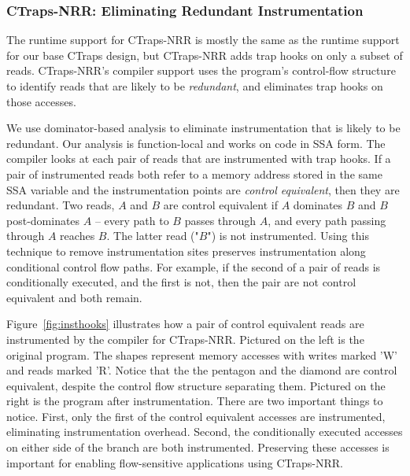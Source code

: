 \documentclass[preprint,9pt]{sigplanconf}
\newcommand{\ctraps}{CTraps\xspace}
\newcommand{\ctrapsmm}{CTraps-NRR\xspace}
\begin{document}
\subsubsection{\ctrapsmm: Eliminating Redundant Instrumentation}
\label{sec:dpo}

The runtime support for \ctrapsmm is mostly the same as the runtime support for
our base \ctraps design, but \ctrapsmm adds trap hooks on only a subset of
reads.  \ctrapsmm's compiler support uses the program's control-flow structure
to identify reads that are likely to be {\em redundant}, and eliminates trap
hooks on those accesses.

We use dominator-based analysis to eliminate instrumentation that is likely to
be redundant.  Our analysis is function-local and works on code in SSA form.
The compiler looks at each pair of reads that are instrumented with trap hooks.
If a pair of instrumented reads both refer to a memory address stored in the
same SSA variable and the instrumentation points are {\em control equivalent},
then they are redundant.  Two reads, $A$ and $B$ are control equivalent if $A$
dominates $B$ and $B$ post-dominates $A$ -- every path to $B$ passes through
$A$, and every path passing through $A$ reaches $B$.  The latter read ("$B$")
is not instrumented.  Using this technique to remove instrumentation sites
preserves instrumentation along conditional control flow paths.  For example,
if the second of a pair of reads is conditionally executed, and the first is
not, then the pair are not control equivalent and both remain.  

Figure~\ref{fig:insthooks} illustrates how a pair of control equivalent reads
are instrumented by the compiler for \ctrapsmm.  Pictured on the left is the
original program.  The shapes represent memory accesses with writes marked 'W'
and reads marked 'R'.  Notice that the the pentagon and the diamond are control
equivalent, despite the control flow structure separating them.  Pictured on
the right is the program after instrumentation.  There are two important things
to notice.  First, only the first of the control equivalent accesses are
instrumented, eliminating instrumentation overhead.  Second, the conditionally
executed accesses on either side of the branch are both instrumented.
Preserving these accesses is important for enabling flow-sensitive applications
using \ctrapsmm.  
\end{document}
